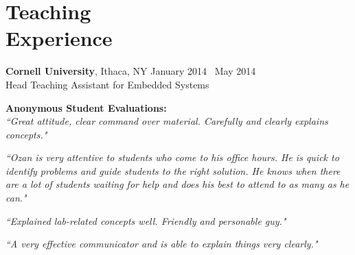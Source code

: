 \section{\mysidestyle \textcolor{olgray}{Teaching\\Experience}}
\textbf{Cornell University}, Ithaca, NY \hfill January 2014 \textendash ~May 2014 \vspace{0mm}\\\vspace{0mm}%
Head Teaching Assistant for Embedded Systems  \hfill \vspace{0mm}\\\vspace{0mm}
\vspace{-4mm}

\textbf{Anonymous Student Evaluations:} \\
\emph{``Great attitude, clear command over material. Carefully and clearly explains concepts."}

\emph{``Ozan is very attentive to students who come to his office hours. He is quick to identify problems and guide students to the right solution. He knows when there are a lot of students waiting for help and does his best to attend to as many as he can."}

\emph{``Explained lab-related concepts well. Friendly and personable guy."}

\emph{``A very effective
communicator and is able to explain things very clearly."}

